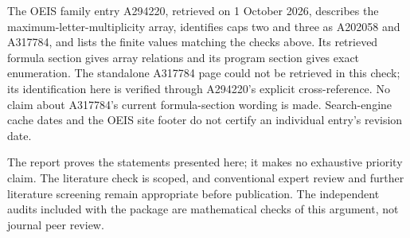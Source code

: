 \documentclass[11pt,letterpaper]{article}
\theoremstyle{remark}\newtheorem{remark}[theorem]{Remark}
\begin{document}
The OEIS family entry A294220, retrieved on 1 October 2026, describes the maximum-letter-multiplicity array, identifies caps two and three as A202058 and A317784, and lists the finite values matching the checks above. Its retrieved formula section gives array relations and its program section gives exact enumeration. The standalone A317784 page could not be retrieved in this check; its identification here is verified through A294220's explicit cross-reference. No claim about A317784's current formula-section wording is made. Search-engine cache dates and the OEIS site footer do not certify an individual entry's revision date.

The report proves the statements presented here; it makes no exhaustive priority claim. The literature check is scoped, and conventional expert review and further literature screening remain appropriate before publication. The independent audits included with the package are mathematical checks of this argument, not journal peer review.
\end{document}
